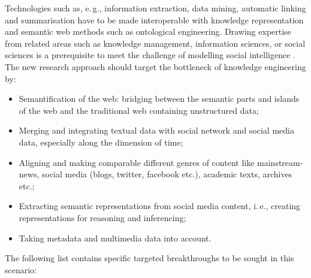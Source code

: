 \documentclass[10pt, plain]{../../metanetpaper}
\begin{document}
\begin{multicols}{2}
Technologies such as, e.\,g., information extraction, data mining, automatic linking and summarisation have to be made interoperable with knowledge representation and semantic web methods such as ontological engineering. Drawing expertise from related areas such as knowledge management, information sciences, or social sciences is a prerequisite to meet the challenge of modelling social intelligence \cite{ltds2012}. The new research approach should target the bottleneck of knowledge engineering by:

\begin{itemize}
\item Semantification of the web: bridging between the semantic parts and islands of the web and the traditional web containing unstructured data;
\item Merging and integrating textual data with social network and social media data, especially along the dimension of time;
\item Aligning and making comparable different genres of content like mainstream-news, social media (blogs, twitter, facebook etc.), academic texts, archives etc.;
\item Extracting semantic representations from social media content, i.\,e., creating representations for reasoning and inferencing;
\item Taking metadata and multimedia data into account.
\end{itemize}

The following list contains specific targeted breakthroughs to be sought in this scenario:


\end{multicols}
\end{document}
